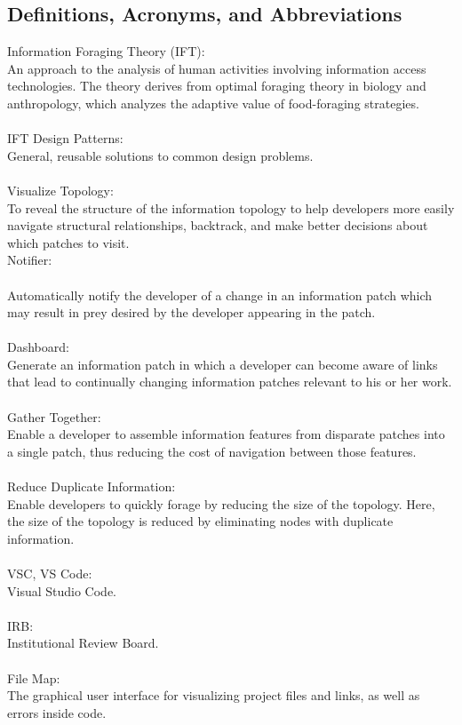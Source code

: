 \documentclass[letterpaper,10pt,titlepage,draftclsnofoot,onecolumn,onesided] {IEEEtran}
\begin{document}
\subsection{Definitions, Acronyms, and Abbreviations}
Information Foraging Theory (IFT): \\
An approach to the analysis of human activities involving information access technologies. The theory derives from optimal foraging theory in biology and anthropology, which analyzes the adaptive value of food-foraging strategies.\\\\
IFT Design Patterns: \\
General, reusable solutions to common design problems.\\\\
Visualize Topology: \\
To reveal the structure of the information topology to help developers more easily navigate structural relationships, backtrack, and make better decisions about which patches to visit.\\
Notifier: \\\\
Automatically notify the developer of a change in an information patch which may result in prey desired by the developer appearing in the patch.\\\\
Dashboard: \\
Generate an information patch in which a developer can become aware of links that lead to continually changing information patches relevant to his or her work.\\\\
Gather Together: \\
Enable a developer to assemble information features from disparate patches into a single patch, thus reducing the cost of navigation between those features.\\\\
Reduce Duplicate Information: \\
Enable developers to quickly forage by reducing the size of the topology. Here, the size of the topology is reduced by eliminating nodes with duplicate information.\\\\
VSC, VS Code:\\
Visual Studio Code.\\\\
IRB: \\
Institutional Review Board.\\\\
File Map: \\
The graphical user interface for visualizing project files and links, as well as errors inside code.
\end{document}
